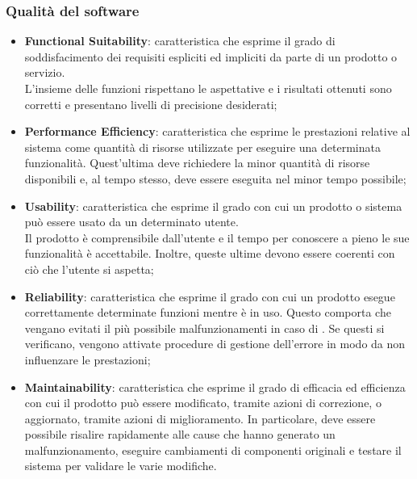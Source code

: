 \subsubsection{Qualità del software}

\begin{itemize}
		\item{\textbf{Functional Suitability}: caratteristica che esprime il grado di soddisfacimento dei requisiti espliciti ed impliciti da parte di un prodotto o servizio.\\ L'insieme delle funzioni rispettano le aspettative e i risultati ottenuti sono corretti e presentano livelli di precisione desiderati;
	}
		\item{\textbf{Performance Efficiency}: 		caratteristica che esprime le prestazioni relative al sistema come quantità di risorse utilizzate per eseguire una determinata funzionalità. Quest'ultima deve richiedere la minor quantità di risorse disponibili e, al tempo stesso, deve essere eseguita nel minor tempo possibile; 
	}
		\item{\textbf{Usability}: caratteristica che esprime il grado con cui un prodotto o sistema può essere usato da un determinato utente. \\ Il prodotto è comprensibile dall'utente e il tempo per conoscere a pieno le sue funzionalità è accettabile. Inoltre, queste ultime devono essere coerenti con ciò che l'utente si aspetta;
	}
		\item{\textbf{Reliability}: caratteristica che esprime il grado con cui un prodotto esegue correttamente determinate funzioni  mentre è in uso. Questo comporta che vengano evitati il più possibile malfunzionamenti in caso di . Se questi si verificano, vengono attivate procedure di gestione dell'errore in modo da non influenzare le prestazioni;
	}
	\item{\textbf{Maintainability}: caratteristica che esprime il grado di efficacia ed efficienza con cui il prodotto può essere modificato, tramite azioni di correzione, o aggiornato, tramite azioni di miglioramento. In particolare, deve essere possibile risalire rapidamente alle cause che hanno generato un malfunzionamento, eseguire cambiamenti di componenti originali e testare il sistema per validare le varie modifiche.
	}
\end{itemize}

